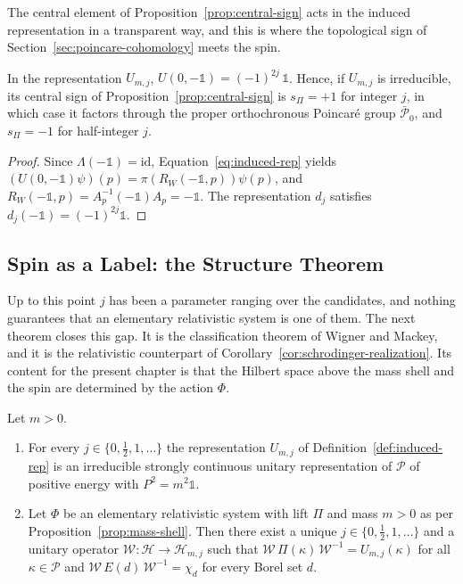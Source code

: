 	The central element of Proposition~\ref{prop:central-sign} acts in the induced representation in a transparent way, and this is where the topological sign of Section~\ref{sec:poincare-cohomology} meets the spin.
	
	\begin{corollary}\label{cor:central-sign-spin}
		In the representation $U_{m,j}$, $U(0,-\mathbb{1})=(-1)^{2j}\,\mathbb{1}$. Hence, if $U_{m,j}$ is irreducible, its central sign of Proposition~\ref{prop:central-sign} is $s_\Pi=+1$ for integer $j$, in which case it factors through the proper orthochronous Poincar\'e group $\bar{\mathcal{P}}_0$, and $s_\Pi=-1$ for half-integer $j$.
	\end{corollary}
	
	\begin{proof}
		Since $\Lambda(-\mathbb{1})=\mathrm{id}$, Equation~\eqref{eq:induced-rep} yields $(U(0,-\mathbb{1})\psi)(p)=\pi(R_W(-\mathbb{1},p))\psi(p)$, and $R_W(-\mathbb{1},p)=A_p^{-1}(-\mathbb{1})A_p=-\mathbb{1}$. The representation $d_j$ satisfies $d_j(-\mathbb{1})=(-1)^{2j}\mathbb{1}$.
	\end{proof}
	
	\subsection{Spin as a Label: the Structure Theorem}\label{subsec:spin-emergence}
	
	Up to this point $j$ has been a parameter ranging over the candidates, and nothing guarantees that an elementary relativistic system is one of them. The next theorem closes this gap. It is the classification theorem of Wigner and Mackey, and it is the relativistic counterpart of Corollary~\ref{cor:schrodinger-realization}. Its content for the present chapter is that the Hilbert space above the mass shell and the spin are determined by the action $\Phi$.
	
	\begin{theorem}\label{thm:wigner-mackey}
		Let $m>0$.
		\begin{enumerate}
			\item For every $j\in\{0,\frac12,1,\dots\}$ the representation $U_{m,j}$ of Definition~\ref{def:induced-rep} is an irreducible strongly continuous unitary representation of $\mathcal{P}$ of positive energy with $P^2=m^2\mathbb{1}$.
			\item Let $\Phi$ be an elementary relativistic system with lift $\Pi$ and mass $m>0$ as per Proposition~\ref{prop:mass-shell}. Then there exist a unique $j\in\{0,\frac12,1,\dots\}$ and a unitary operator $\mathcal{W}:\mathcal{H}\to\mathcal{H}_{m,j}$ such that $\mathcal{W}\,\Pi(\kappa)\,\mathcal{W}^{-1}=U_{m,j}(\kappa)$ for all $\kappa\in\mathcal{P}$ and $\mathcal{W}\,E(d)\,\mathcal{W}^{-1}=\chi_d$ for every Borel set $d$.
		\end{enumerate}
	\end{theorem}
	
